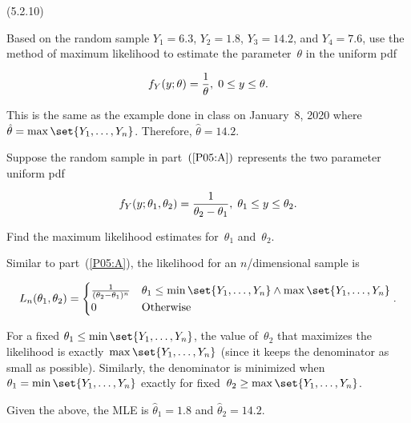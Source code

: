 \begin{problem}
  (\textnormal{5.2.10})
\end{problem}

\begin{subproblem}\label{P05:A}
  Based on the random sample ${Y_1=6.3}$, ${Y_2 = 1.8}$, ${Y_3 = 14.2}$, and ${Y_4 = 7.6}$, use the method of maximum likelihood to estimate the parameter~$\theta$ in the uniform pdf

  \begin{equation}
    f_{Y}(y;\theta) = \frac{1}{\theta}, \hspace{0.1cm} 0 \leq y \leq \theta \text{.}
  \end{equation}
\end{subproblem}

This is the same as the example done in class on January~8, 2020 where ${\hat{\theta} = \max\set{Y_1,\ldots,Y_{n}}}$.  Therefore, $\boxed{{\hat{\theta} = 14.2}}$.

\begin{subproblem}
  Suppose the random sample in part~$(\ref{P05:A})$ represents the two parameter uniform pdf

  \begin{equation}\label{eq:P05:b}
    f_{Y}(y;\theta_1,\theta_2) = \frac{1}{\theta_2 - \theta_1}, \hspace{0.1cm} \theta_{1} \leq y \leq \theta_{2} \text{.}
  \end{equation}

  \noindent
  Find the maximum likelihood estimates for~$\theta_1$ and~$\theta_{2}$.
\end{subproblem}

Similar to part~(\ref{P05:A}), the likelihood for an $n$\-/dimensional sample is

\begin{equation}
  L_{n}(\theta_{1},\theta_{2}) =  \begin{cases}
                                    \frac{1}{(\theta_{2} - \theta_{1})^{n}} & \theta_{1} \leq \min\set{Y_1,\ldots,Y_n} \wedge \max\set{Y_1,\ldots,Y_n} \\
                                    0 & \text{Otherwise}
                                  \end{cases}\text{.}
\end{equation}

\noindent
For a fixed ${\theta_{1} \leq \min\set{Y_{1},\ldots,Y_{n}}}$, the value of~$\theta_{2}$ that maximizes the likelihood is exactly~${\max\set{Y_1,\ldots,Y_n}}$ (since it keeps the denominator as small as possible).  Similarly, the denominator is minimized when ${\theta_{1} = \min\set{Y_{1},\ldots,Y_{n}}}$ exactly for fixed~${\theta_{2} \geq \max\set{Y_{1},\ldots,Y_{n}}}$.

Given the above, the MLE is $\boxed{{\hat{\theta}_{1}=1.8}}$ and $\boxed{{\hat{\theta}_{2} = 14.2}}$.

